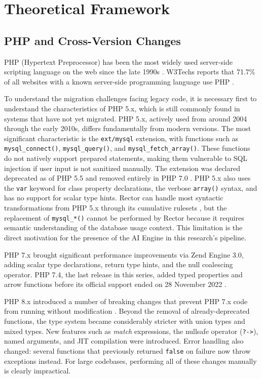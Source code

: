 \section{Theoretical Framework}

\subsection{PHP and Cross-Version Changes}

PHP (Hypertext Preprocessor) has been the most widely used server-side scripting language on the web since the late 1990s \cite{phpgroup_history}. W3Techs reports that 71.7\% of all websites with a known server-side programming language use PHP \cite{w3techs2024php}.

To understand the migration challenges facing legacy code, it is necessary first to understand the characteristics of PHP 5.x, which is still commonly found in systems that have not yet migrated. PHP 5.x, actively used from around 2004 through the early 2010s, differs fundamentally from modern versions. The most significant characteristic is the \texttt{ext/mysql} extension, with functions such as \texttt{mysql\_connect()}, \texttt{mysql\_query()}, and \texttt{mysql\_fetch\_array()}. These functions do not natively support prepared statements, making them vulnerable to SQL injection if user input is not sanitized manually. The extension was declared deprecated as of PHP 5.5 and removed entirely in PHP 7.0 \cite{phpgroup2022supported}. PHP 5.x also uses the \texttt{var} keyword for class property declarations, the verbose \texttt{array()} syntax, and has no support for scalar type hints. Rector can handle most syntactic transformations from PHP 5.x through its cumulative rulesets \cite{rector2024}, but the replacement of \texttt{mysql\_*()} cannot be performed by Rector because it requires semantic understanding of the database usage context. This limitation is the direct motivation for the presence of the AI Engine in this research's pipeline.

PHP 7.x brought significant performance improvements via Zend Engine 3.0, adding scalar type declarations, return type hints, and the null coalescing operator. PHP 7.4, the last release in this series, added typed properties and arrow functions before its official support ended on 28 November 2022 \cite{phpgroup2022supported}.

PHP 8.x introduced a number of breaking changes that prevent PHP 7.x code from running without modification \cite{phpgroup2022supported}. Beyond the removal of already-deprecated functions, the type system became considerably stricter with union types and mixed types. New features such as \textit{match} expressions, the nullsafe operator (\texttt{?->}), named arguments, and JIT compilation were introduced. Error handling also changed: several functions that previously returned \texttt{false} on failure now throw exceptions instead. For large codebases, performing all of these changes manually is clearly impractical.

